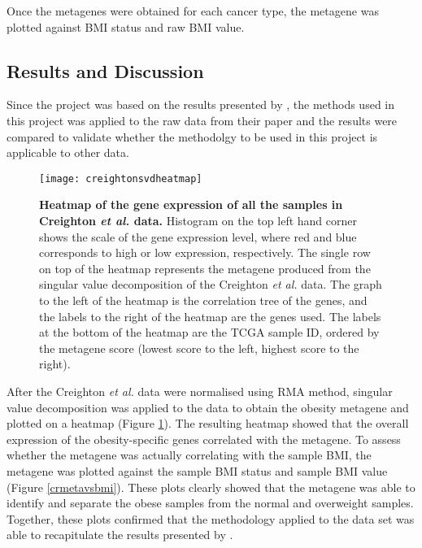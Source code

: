 \documentclass[12pt, a4paper]{article}
\begin{document}
\begin{description}[leftmargin=0pt]
\item[Assessing whether the metagene is associated with BMI.]

Once the metagenes were obtained for each cancer type, the metagene was plotted against BMI status and raw BMI value.

\end{description}



\vspace{-30pt}

\subsection*{Results and Discussion}

Since the project was based on the results presented by \citet{Creighton2012}, the methods used in this project was applied to the raw data from their paper and the results were compared to validate whether the methodolgy to be used in this project is applicable to other data.

\begin{figure}[h!]
\centering
\texttt{[image: creightonsvdheatmap]}
\caption{\textbf{Heatmap of the gene expression of all the samples in Creighton \textit{et al.} data.}
Histogram on the top left hand corner shows the scale of the gene expression level, where red  and blue corresponds to high or low expression, respectively.
The single row on top of the heatmap represents the metagene produced from the singular value decomposition of the Creighton \textit{et al.} data.
The graph to the left of the heatmap is the correlation tree of the genes, and the labels to the right of the heatmap are the genes used.
The labels at the bottom of the heatmap are the TCGA sample ID, ordered by the metagene score (lowest score to the left, highest score to the right).}
\label{crheatmap}
\end{figure}

After the Creighton \textit{et al.} data were normalised using RMA method, singular value decomposition was applied to the data to obtain the obesity metagene and plotted on a heatmap (Figure \ref{crheatmap}).
The resulting heatmap showed that the overall expression of the obesity-specific genes correlated with the metagene.
To assess whether the metagene was actually correlating with the sample BMI, the metagene was plotted against the sample BMI status and sample BMI value (Figure \ref{crmetavsbmi}).
These plots clearly showed that the metagene was able to identify and separate the obese samples from the normal and overweight samples.
Together, these plots confirmed that the methodology applied to the data set was able to recapitulate the results presented by \citet{Creighton2012}.
\end{document}
